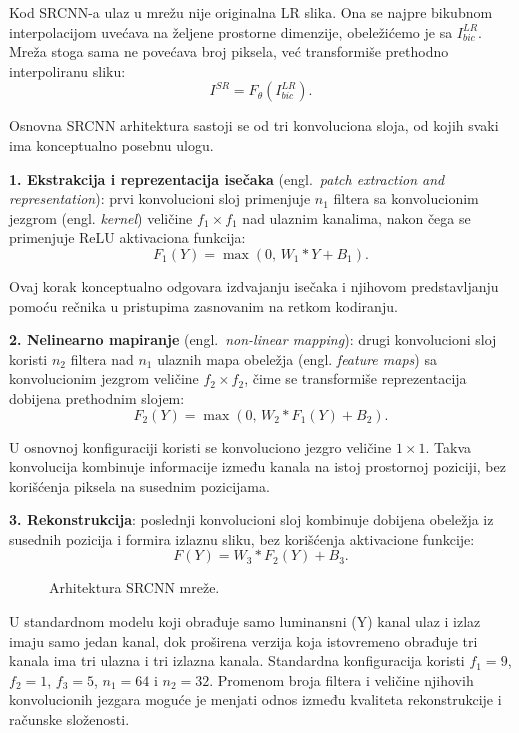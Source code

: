 \documentclass[12pt,a4paper]{article}
\begin{document}
Kod SRCNN-a ulaz u mrežu nije originalna LR slika. Ona se najpre bikubnom interpolacijom uvećava na željene prostorne dimenzije, obeležićemo je sa $I^{LR}_{bic}$. Mreža stoga sama ne povećava broj piksela, već transformiše prethodno interpoliranu sliku:
\begin{equation}
	I^{SR} = F_{\theta}(I^{LR}_{bic}).
\end{equation}

Osnovna SRCNN arhitektura sastoji se od tri konvoluciona sloja, od kojih svaki ima konceptualno posebnu ulogu.

\textbf{1. Ekstrakcija i reprezentacija isečaka}
(engl.\ \textit{patch extraction and representation}):
prvi konvolucioni sloj primenjuje $n_1$ filtera sa konvolucionim jezgrom (engl. \textit{kernel}) veličine $f_1 \times f_1$ nad ulaznim kanalima, nakon čega se primenjuje ReLU aktivaciona funkcija:
\begin{equation}
	F_1(Y) = \max(0,\,W_1 * Y + B_1).
\end{equation}

Ovaj korak konceptualno odgovara izdvajanju isečaka i njihovom predstavljanju pomoću rečnika u pristupima zasnovanim na retkom kodiranju.

\textbf{2. Nelinearno mapiranje}
(engl.\ \textit{non-linear mapping}):
drugi konvolucioni sloj koristi $n_2$ filtera nad $n_1$ ulaznih mapa obeležja (engl. \textit{feature maps}) sa konvolucionim jezgrom veličine $f_2 \times f_2$, čime se transformiše reprezentacija dobijena prethodnim slojem:
\begin{equation}
	F_2(Y) = \max(0,\,W_2 * F_1(Y) + B_2).
\end{equation}

U osnovnoj konfiguraciji koristi se konvoluciono jezgro veličine $1 \times 1$. Takva konvolucija kombinuje informacije između kanala na istoj prostornoj poziciji, bez korišćenja piksela na susednim pozicijama.

\textbf{3. Rekonstrukcija}:
poslednji konvolucioni sloj kombinuje dobijena obeležja iz susednih pozicija i formira izlaznu sliku, bez korišćenja aktivacione funkcije:
\begin{equation}
	F(Y) = W_3 * F_2(Y) + B_3.
\end{equation}

\begin{figure}[H]
	\centering
	
	\caption{Arhitektura SRCNN mreže.}
	\label{fig:srcnn}
\end{figure}

U standardnom modelu koji obrađuje samo luminansni (Y) kanal ulaz i izlaz imaju samo jedan kanal, dok proširena verzija koja istovremeno obrađuje tri kanala ima tri ulazna i tri izlazna kanala.
Standardna konfiguracija koristi $f_1=9$, $f_2=1$, $f_3=5$, $n_1=64$ i $n_2=32$. Promenom broja filtera i veličine njihovih konvolucionih jezgara moguće je menjati odnos između kvaliteta rekonstrukcije i računske složenosti.
\end{document}
